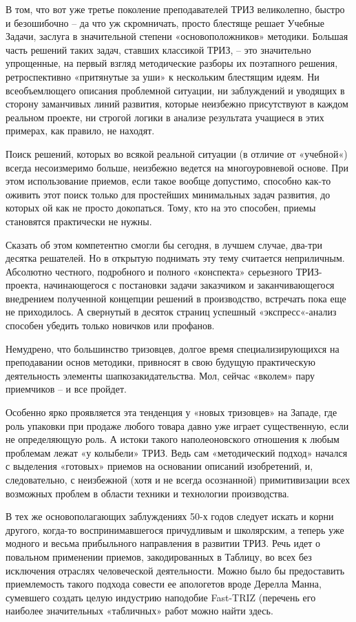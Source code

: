 \documentclass[11pt,a4paper]{article}
\begin{document}
В том, что вот уже третье поколение преподавателей ТРИЗ великолепно, быстро и
безошибочно -- да что уж скромничать, просто блестяще решает Учебные Задачи,
заслуга в значительной степени «основоположников» методики. Большая часть
решений таких задач, ставших классикой ТРИЗ, -- это значительно упрощенные, на
первый взгляд методические разборы их поэтапного решения, ретроспективно
«притянутые за уши» к нескольким блестящим идеям. Ни всеобъемлющего описания
проблемной ситуации, ни заблуждений и уводящих в сторону заманчивых линий
развития, которые неизбежно присутствуют в каждом реальном проекте, ни строгой
логики в анализе результата учащиеся в этих примерах, как правило, не находят.

Поиск решений, которых во всякой реальной ситуации (в отличие от «учебной«)
всегда несоизмеримо больше, неизбежно ведется на многоуровневой основе. При
этом использование приемов, если такое вообще допустимо, способно как-то
оживить этот поиск только для простейших минимальных задач развития, до
которых ой как не просто докопаться. Тому, кто на это способен, приемы
становятся практически не нужны.

Сказать об этом компетентно смогли бы сегодня, в лучшем случае, два-три
десятка решателей. Но в открытую поднимать эту тему считается неприличным.
Абсолютно честного, подробного и полного «конспекта» серьезного ТРИЗ-проекта,
начинающегося с постановки задачи заказчиком и заканчивающегося внедрением
полученной концепции решений в производство, встречать пока еще не
приходилось. А свернутый в десяток страниц успешный «экспресс«-анализ способен
убедить только новичков или профанов.

Немудрено, что большинство тризовцев, долгое время специализирующихся на
преподавании основ методики, привносят в свою будущую практическую
деятельность элементы шапкозакидательства. Мол, сейчас «вколем» пару
приемчиков -- и все пройдет.

Особенно ярко проявляется эта тенденция у «новых тризовцев» на Западе, где
роль упаковки при продаже любого товара давно уже играет существенную, если не
определяющую роль. А истоки такого наполеоновского отношения к любым проблемам
лежат «у колыбели» ТРИЗ. Ведь сам «методический подход» начался с выделения
«готовых» приемов на основании описаний изобретений, и, следовательно, с
неизбежной (хотя и не всегда осознанной) примитивизации всех возможных проблем
в области техники и технологии производства.

В тех же основополагающих заблуждениях 50-х годов следует искать и корни
другого, когда-то воспринимавшегося причудливым и школярским, а теперь уже
модного и весьма прибыльного направления в развитии ТРИЗ. Речь идет о
повальном применении приемов, закодированных в Таблицу, во всех без исключения
отраслях человеческой деятельности. Можно было бы предоставить приемлемость
такого подхода совести ее апологетов вроде Дерелла Манна, сумевшего создать
целую индустрию наподобие Fast-TRIZ (перечень его наиболее значительных
«табличных» работ можно найти здесь.
\end{document}
